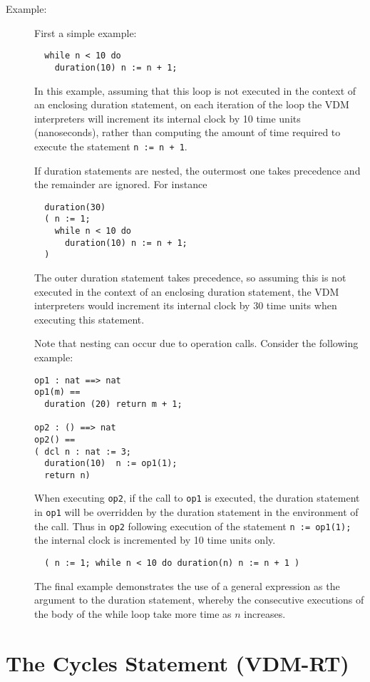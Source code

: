 \documentclass{overturerepchap}
\begin{document}
{\begin{description}
\item[Example:] First a simple example:
\begin{lstlisting}
  while n < 10 do
    duration(10) n := n + 1;
\end{lstlisting}
In this example, assuming that this loop is not executed in the
context of an enclosing duration statement, on each iteration of the
loop the VDM interpreters will increment its internal clock by 10 time
units (nanoseconds),
rather than computing the amount of time required to execute the
statement \texttt{n := n + 1}.

If duration statements are nested, the outermost one takes precedence
and the remainder are ignored. For instance
\begin{lstlisting}
  duration(30)
  ( n := 1;
    while n < 10 do
      duration(10) n := n + 1;
  )
\end{lstlisting}
The outer duration statement takes precedence, so assuming this is not
executed in the context of an enclosing duration statement, the
VDM interpreters would increment its internal clock by 30 time units when
executing this statement.

Note that nesting can occur due to operation calls. Consider the
following example:
\begin{lstlisting}
op1 : nat ==> nat
op1(m) ==
  duration (20) return m + 1;

op2 : () ==> nat
op2() ==
( dcl n : nat := 3;
  duration(10)  n := op1(1);
  return n)
\end{lstlisting}
When executing \texttt{op2}, if the call to \texttt{op1} is
executed, the duration statement in \texttt{op1} will be overridden by
the duration statement in the environment of the call. Thus in
\texttt{op2} following execution of the statement
\texttt{n := op1(1);} the internal clock is incremented by 10 time units
only.

\begin{lstlisting}
  ( n := 1; while n < 10 do duration(n) n := n + 1 )
\end{lstlisting}

The final example demonstrates the use of a general expression as the argument to the duration statement, whereby the consecutive executions of the body of the while loop take more time as $n$ increases.

\end{description}

\section{The Cycles Statement (VDM-RT)}

}
\end{document}
